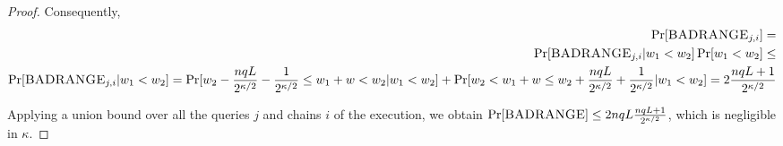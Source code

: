 \begin{proof}
  Consequently,
  \begin{align*}
    \Pr[\textsc{BADRANGE}_{j,i}] =\\
    \Pr[\textsc{BADRANGE}_{j,i}|w_1 < w_2]\Pr[w_1 < w_2] \leq\\
    \Pr[\textsc{BADRANGE}_{j,i}|w_1 < w_2] =
    \Pr[w_2 - \frac{nqL}{2^{\kappa/2}} - \frac{1}{2^{\kappa/2}} \leq w_1 + w < w_2 | w_1 < w_2] +
    \Pr[w_2 < w_1 + w \leq w_2 + \frac{nqL}{2^{\kappa/2}} + \frac{1}{2^{\kappa/2}} | w_1 < w_2] =
    2 \frac{nqL + 1}{2^{\kappa/2}}\\
  \end{align*}

  Applying a union bound over all the queries $j$ and chains $i$ of the execution, we obtain
  $\Pr[\textsc{BADRANGE}] \leq 2 nqL \frac{nqL + 1}{2^{\kappa/2}}$, which is negligible in $\kappa$.
  \Qed
\end{proof}


